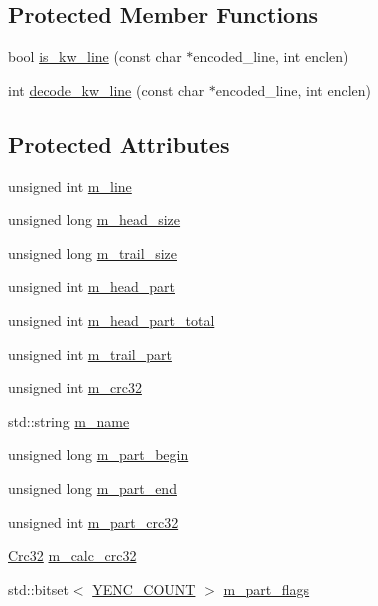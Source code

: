 \subsection*{Protected Member Functions}
\begin{DoxyCompactItemize}
\item 
bool \hyperlink{classy_enc_1_1_decoder_accc08e169257c8b6f4296542d2840bdb}{is\+\_\+kw\+\_\+line} (const char $\ast$encoded\+\_\+line, int enclen)
\item 
int \hyperlink{classy_enc_1_1_decoder_af1868fb8c1445bbe32751e839a1403b4}{decode\+\_\+kw\+\_\+line} (const char $\ast$encoded\+\_\+line, int enclen)
\end{DoxyCompactItemize}
\subsection*{Protected Attributes}
\begin{DoxyCompactItemize}
\item 
unsigned int \hyperlink{classy_enc_1_1_decoder_a43dd2c6ca202f5a351554669136962a7}{m\+\_\+line}
\item 
unsigned long \hyperlink{classy_enc_1_1_decoder_ac1a7d0f668504321d1141f16672b61cb}{m\+\_\+head\+\_\+size}
\item 
unsigned long \hyperlink{classy_enc_1_1_decoder_aafc770fbc2a7195c041112572f7ee876}{m\+\_\+trail\+\_\+size}
\item 
unsigned int \hyperlink{classy_enc_1_1_decoder_a2365fd29009a7b4151435445080c5706}{m\+\_\+head\+\_\+part}
\item 
unsigned int \hyperlink{classy_enc_1_1_decoder_a4d4f443127e17bd65927824ce1eef3a6}{m\+\_\+head\+\_\+part\+\_\+total}
\item 
unsigned int \hyperlink{classy_enc_1_1_decoder_ad5b7ac19fa8ca63d83781afc14f96bb6}{m\+\_\+trail\+\_\+part}
\item 
unsigned int \hyperlink{classy_enc_1_1_decoder_a623c6d2e689b8f869e939d03d9673271}{m\+\_\+crc32}
\item 
std\+::string \hyperlink{classy_enc_1_1_decoder_a0cf2e8181fd9d392207221101c415d33}{m\+\_\+name}
\item 
unsigned long \hyperlink{classy_enc_1_1_decoder_a6e33e34da040edb96b57f1b9311b3ac5}{m\+\_\+part\+\_\+begin}
\item 
unsigned long \hyperlink{classy_enc_1_1_decoder_a11de19ca153e7731a281d508adc4a7ca}{m\+\_\+part\+\_\+end}
\item 
unsigned int \hyperlink{classy_enc_1_1_decoder_a3cbcb4f8c5ee3c60017afc02ed037a6e}{m\+\_\+part\+\_\+crc32}
\item 
\hyperlink{class_crc32}{Crc32} \hyperlink{classy_enc_1_1_decoder_ae0a4c10d6eecdc2e0c93f60a81c9e5e5}{m\+\_\+calc\+\_\+crc32}
\item 
std\+::bitset$<$ \hyperlink{classy_enc_1_1_decoder_a15a9416c693c4a3333d0b2417decdffeae4f10b60345053ec76d279f0b1a28dcf}{Y\+E\+N\+C\+\_\+\+C\+O\+U\+NT} $>$ \hyperlink{classy_enc_1_1_decoder_a12eee9d1b428b91da6a4ab79086e6073}{m\+\_\+part\+\_\+flags}
\end{DoxyCompactItemize}


